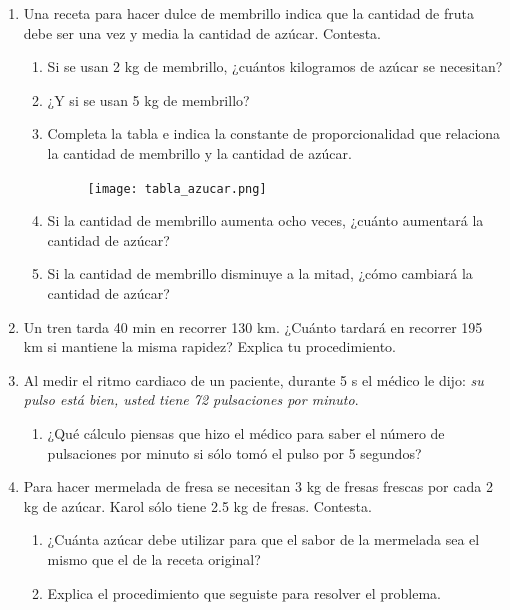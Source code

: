 \documentclass[11pt]{book}
\begin{document}
\begin{enumerate}
  \item Una receta para hacer dulce de membrillo indica que la cantidad de fruta debe
        ser una vez y media la cantidad de azúcar. Contesta.
        \begin{enumerate}
          \item Si se usan 2 kg de membrillo, ¿cuántos kilogramos de azúcar se necesitan?
          \item ¿Y si se usan 5 kg de membrillo?
          \item Completa la tabla e indica la constante de proporcionalidad que relaciona la cantidad
                de membrillo y la cantidad de azúcar.
                \begin{figure}[H]
                  \centering
                  \texttt{[image: tabla\_azucar.png]}
                  \label{tab:tabla_azucar}
                \end{figure}
          \item Si la cantidad de membrillo aumenta ocho veces, ¿cuánto aumentará la cantidad
                de azúcar?
          \item Si la cantidad de membrillo disminuye a la mitad, ¿cómo cambiará la cantidad de
                azúcar?
        \end{enumerate}
  \item Un tren tarda 40 min en recorrer 130 km. ¿Cuánto tardará en recorrer 195 km si
        mantiene la misma rapidez? Explica tu procedimiento.
  \item Al medir el ritmo cardiaco de un paciente, durante 5 s el médico le dijo: \emph{su
          pulso está bien, usted tiene 72 pulsaciones por minuto}.
        \begin{enumerate}
          \item ¿Qué cálculo piensas que hizo el médico para saber el número de pulsaciones
                por minuto si sólo tomó el pulso por 5 segundos?
        \end{enumerate}
  \item Para hacer mermelada de fresa se necesitan 3 kg de fresas frescas por cada 2 kg
        de azúcar. Karol sólo tiene 2.5 kg de fresas. Contesta.
        \begin{enumerate}
          \item ¿Cuánta azúcar debe utilizar para que el sabor de la mermelada sea el mismo que
                el de la receta original?
          \item Explica el procedimiento que seguiste para resolver el problema.

\end{enumerate}
\end{enumerate}
\end{document}
